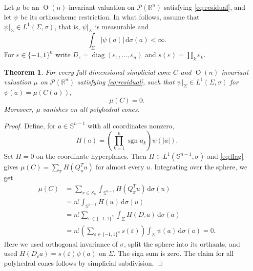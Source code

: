 \documentclass[11pt]{article}
\newcommand{\R}{\mathbb{R}}
\newcommand{\eps}{\varepsilon}
\newcommand{\sig}{\sigma}
\newcommand{\PP}{\mathcal P}
\newcommand{\On}[1]{\operatorname{O}(#1)}
\newcommand{\sphere}[1]{\mathbb{S}^{#1}}
\DeclareMathOperator{\sgn}{sgn}
\DeclareMathOperator{\diag}{diag}
\newtheorem{theorem}{Theorem}[section]
\begin{document}
Let $\mu$ be an $\On n$-invariant valuation on $\PP(\R^n)$ satisfying
\eqref{eq:residual}, and let $\psi$ be its orthoscheme restriction. In what 
follows, assume that $\psi|_{\Sigma}\in L^1(\Sigma,\sigma)$, that is, $\psi|_{\Sigma}$ is measurable and
\begin{equation}\label{eq:integrability}
 \int_\Sigma|\psi(a)|\,\mathrm{d}\sigma(a)<\infty.
\end{equation}
For $\eps\in\{-1,1\}^n$ write $D_\eps=\diag(\eps_1,\ldots,\eps_n)$
and $s(\eps)=\prod_k\eps_k$.

\begin{theorem}\label{thm:average}
For every full-dimensional simplicial cone $C$ and $\On n$-invariant valuation $\mu$ on $\PP(\R^n)$ satisfying \eqref{eq:residual}, such that $\psi|_{\Sigma}\in L^1(\Sigma,\sigma)$ for $\psi(a)=\mu(C(a))$,
\begin{equation}\label{eq:average}
 \mu(C)=0. %
\end{equation}
Moreover, $\mu$ vanishes on all polyhedral cones.
\end{theorem}

\begin{proof}
Define, for $a\in\sphere{n-1}$ with all coordinates nonzero,
\[
 H(a)=\left(\prod_{k=1}^n\sgn a_k\right)\psi(|a|).
\]
Set $H=0$ on the coordinate hyperplanes. Then $H\in L^1(\sphere{n-1},\sigma)$ and \eqref{eq:flag} gives
$\mu(C)=\sum_\pi H(Q_\pi^Tu)$ for almost every $u$. Integrating over the sphere, we get
\begin{align*}
  \mu(C) &= \sum_{\pi\in S_n}\int_{\sphere{n-1}}H(Q_\pi^Tu)\,\mathrm{d}\sigma(u) \\
  &= n!\int_{\sphere{n-1}}H(u)\,\mathrm{d}\sigma(u) \\
  &= n!\sum_{\eps\in\{-1,1\}^n}\int_\Sigma H(D_\eps a)\,\mathrm{d}\sigma(a) \\
  &= n!\left(\sum_{\eps\in\{-1,1\}^n}s(\eps)\right)
       \int_\Sigma\psi(a)\,\mathrm{d}\sigma(a)=0.
\end{align*}
Here we used orthogonal invariance of $\sigma$, split the sphere into its
orthants, and used $H(D_\eps a)=s(\eps)\psi(a)$ on $\Sigma$.
The sign sum is zero. The claim for all polyhedral cones
follows by simplicial subdivision.
\end{proof}
\end{document}
